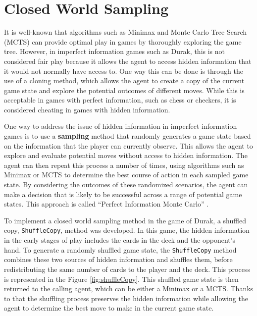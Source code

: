 \section{Closed World Sampling}
\label{closedWorld}
It is well-known that algorithms such as Minimax and Monte Carlo Tree Search (MCTS) can provide optimal play in games by thoroughly exploring the game tree. However, in imperfect information games such as Durak, this is not considered fair play because it allows the agent to access hidden information that it would not normally have access to. One way this can be done is through the use of a cloning method, which allows the agent to create a copy of the current game state and explore the potential outcomes of different moves. While this is acceptable in games with perfect information, such as chess or checkers, it is considered cheating in games with hidden information.

One way to address the issue of hidden information in imperfect information games is to use a \textbf{sampling} method that randomly generates a game state based on the information that the player can currently observe. This allows the agent to explore and evaluate potential moves without access to hidden information. The agent can then repeat this process a number of times, using algorithms such as Minimax or MCTS to determine the best course of action in each sampled game state. By considering the outcomes of these randomized scenarios, the agent can make a decision that is likely to be successful across a range of potential game states. This approach is called  ``Perfect Information Monte Carlo'' \citep{PerfectInformationMC}.

To implement a closed world sampling method in the game of Durak, a shuffled copy, \texttt{ShuffleCopy}, method was developed. In this game, the hidden information in the early stages of play includes the cards in the deck and the opponent's hand. To generate a randomly shuffled game state, the \texttt{ShuffleCopy} method combines these two sources of hidden information and shuffles them, before redistributing the same number of cards to the player and the deck. This process is represented in the Figure \ref{fig:shuffleCopy}. This shuffled game state is then returned to the calling agent, which can be either a Minimax or a MCTS. Thanks to that the shuffling process preserves the hidden information while allowing the agent to determine the best move to make in the current game state.

